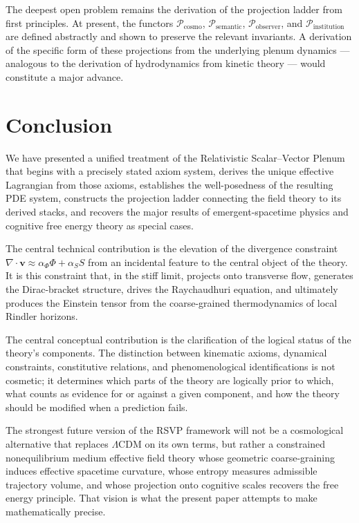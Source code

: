 \documentclass[12pt, a4paper]{article}
\theoremstyle{plain}
\theoremstyle{definition}
\theoremstyle{remark}
\newcommand{\vfield}{\mathbf{v}}
\newcommand{\Proj}[1]{\mathcal{P}_{#1}}
\newcommand{\divv}{\nabla\!\cdot\!\vfield}
\begin{document}
The deepest open problem remains the derivation of the projection ladder from first
principles.  At present, the functors $\Proj{\mathrm{cosmo}}$, $\Proj{\mathrm{semantic}}$,
$\Proj{\mathrm{observer}}$, and $\Proj{\mathrm{institution}}$ are defined abstractly and
shown to preserve the relevant invariants.  A derivation of the specific form of these
projections from the underlying plenum dynamics --- analogous to the derivation of
hydrodynamics from kinetic theory --- would constitute a major advance.

\section{Conclusion}
\label{sec:conclusion}

We have presented a unified treatment of the Relativistic Scalar--Vector Plenum that
begins with a precisely stated axiom system, derives the unique effective Lagrangian
from those axioms, establishes the well-posedness of the resulting PDE system, constructs
the projection ladder connecting the field theory to its derived stacks, and recovers
the major results of emergent-spacetime physics and cognitive free energy theory as special
cases.

The central technical contribution is the elevation of the divergence constraint
$\divv \approx \alpha_\Phi\Phi + \alpha_S S$ from an incidental feature to the central
object of the theory.  It is this constraint that, in the stiff limit, projects onto
transverse flow, generates the Dirac-bracket structure, drives the Raychaudhuri equation,
and ultimately produces the Einstein tensor from the coarse-grained thermodynamics of
local Rindler horizons.

The central conceptual contribution is the clarification of the logical status of the
theory's components.  The distinction between kinematic axioms, dynamical constraints,
constitutive relations, and phenomenological identifications is not cosmetic; it determines
which parts of the theory are logically prior to which, what counts as evidence for or
against a given component, and how the theory should be modified when a prediction fails.

The strongest future version of the RSVP framework will not be a cosmological alternative
that replaces $\Lambda$CDM on its own terms, but rather a constrained nonequilibrium medium
effective field theory whose geometric coarse-graining induces effective spacetime curvature,
whose entropy measures admissible trajectory volume, and whose projection onto cognitive
scales recovers the free energy principle.  That vision is what the present paper attempts
to make mathematically precise.
\end{document}
